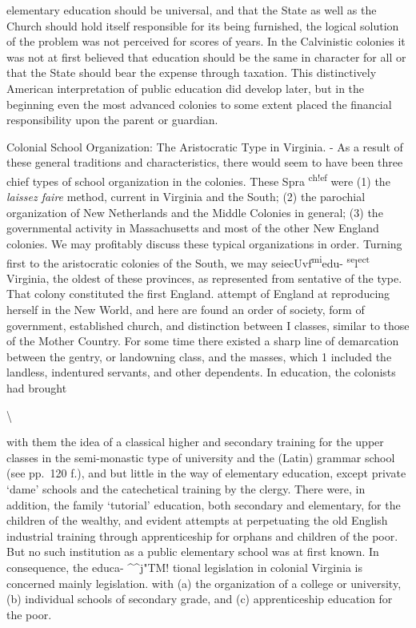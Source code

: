 \documentclass[]{book}
\begin{document}
elementary education should be universal, and that the State as well as the Church should hold itself responsible for its being furnished, the logical solution of the problem was not perceived for scores of years. In the Calvinistic colonies it was not at first believed that education should be the same in character for all or that the State should bear the expense through taxation. This distinctively American interpretation of public education did develop later, but in the beginning even the most advanced colonies to some extent placed the financial responsibility upon the parent or guardian.

Colonial School Organization: The Aristocratic Type in Virginia. - As a result of these general traditions and characteristics, there would seem to have been three chief types of school organization in the colonies. These Spra \textsuperscript{ch!ef} were (1) the \emph{laissez faire} method, current in Virginia and the South; (2) the parochial organization of New Netherlands and the Middle Colonies in general; (3) the governmental activity in Massachusetts and most of the other New England colonies. We may profitably discuss these typical organizations in order. Turning first to the aristocratic colonies of the South, we may seiecUvf\textsuperscript{mi}edu- \textsuperscript{se}l\textsuperscript{ect} Virginia, the oldest of these provinces, as represented from sentative of the type. That colony constituted the first England. attempt of England at reproducing herself in the New World, and here are found an order of society, form of government, established church, and distinction between I classes, similar to those of the Mother Country. For some time there existed a sharp line of demarcation between the gentry, or landowning class, and the masses, which 1 included the landless, indentured servants, and other dependents. In education, the colonists had brought

\textbackslash{}

with them the idea of a classical higher and secondary training for the upper classes in the semi-monastic type of university and the (Latin) grammar school (see pp.~120 f.), and but little in the way of elementary education, except private `dame' schools and the catechetical training by the clergy. There were, in addition, the family `tutorial' education, both secondary and elementary, for the children of the wealthy, and evident attempts at perpetuating the old English industrial training through apprenticeship for orphans and children of the poor. But no such institution as a public elementary school was at first known. In consequence, the educa- \^{}\^{}j"TM! tional legislation in colonial Virginia is concerned mainly legislation. with (a) the organization of a college or university, (b) individual schools of secondary grade, and (c) apprenticeship education for the poor.
\end{document}
